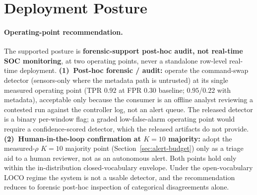 \documentclass[sensors,article,submit,moreauthors,pdftex]{Definitions/mdpi}
\begin{document}
\section{Deployment Posture}
\label{sec:deployment}

\paragraph{Operating-point recommendation.} The supported posture is \textbf{forensic-support post-hoc audit, not real-time SOC monitoring}, at two operating points, never a standalone row-level real-time deployment. \textbf{(1)~Post-hoc forensic / audit:} operate the command-swap detector (sensors-only where the metadata path is untrusted) at its single measured operating point (TPR $0.92$ at FPR $0.30$ baseline; $0.95$/$0.22$ with metadata), acceptable only because the consumer is an offline analyst reviewing a contested run against the controller log, not an alert queue. The released detector is a binary per-window flag; a graded low-false-alarm operating point would require a confidence-scored detector, which the released artifacts do not provide. \textbf{(2)~Human-in-the-loop confirmation at $K\!=\!10$ majority:} adopt the measured-$\rho$ $K\!=\!10$ majority point (Section~\ref{sec:alert-budget}) only as a triage aid to a human reviewer, not as an autonomous alert. Both points hold only within the in-distribution closed-vocabulary envelope. Under the open-vocabulary LOCO regime the system is not a usable detector, and the recommendation reduces to forensic post-hoc inspection of categorical disagreements alone.
\end{document}

